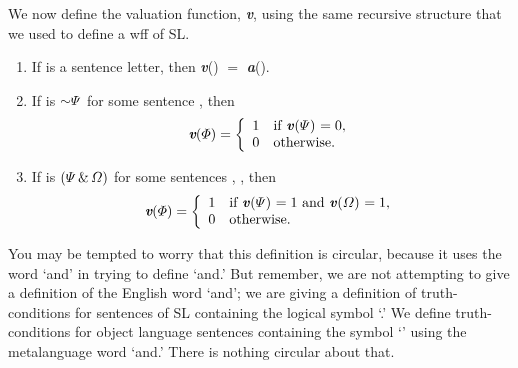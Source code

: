 {{We now define the valuation function, \textit{\textbf{v}}, using the same recursive structure that we used to define a wff of SL.

\begin{enumerate}
\item If \metaA{} is a sentence letter, then \textit{\textbf{v}}(\metaA{}) $=$ \textit{\textbf{a}}(\metaA{}).



\item If \metaA{} is ${\enot}\metaB{}$ for some sentence \metaB{}, then
\begin{displaymath}\textit{\textbf{v}}(\varPhi{}) =
	\left\{\begin{array}{ll}
	1 & \mbox{if \textit{\textbf{v}}(\ensuremath{\varPsi}{}) $= 0$},\\
	0 & \mbox{otherwise.}
	\end{array}\right.
\end{displaymath}

\item If \metaA{} is $(\varPsi{}\,\&\,\varOmega{})$ for some sentences \metaB{}, \metaC{}, then
\begin{displaymath}\textit{\textbf{v}}(\varPhi{}) =
	\left\{\begin{array}{ll}
	1 & \mbox{if \textit{\textbf{v}}(\ensuremath{\varPsi}{}) $= 1$ and \textit{\textbf{v}}(\ensuremath{\varOmega}{}) $= 1$,}\\
	0 & \mbox{otherwise.}
	\end{array}\right.
\end{displaymath}
\end{enumerate}
\label{truthdefinition}
You may be tempted to worry that this definition is circular, because it uses the word `and' in trying to define `and.' But remember, we are not attempting to give a definition of the English word `and'; we are giving a definition of truth-conditions for sentences of SL containing the logical symbol `\eand.' We define truth-conditions for object language sentences containing the symbol `\eand' using the metalanguage word `and.' There is nothing circular about that.

}}
